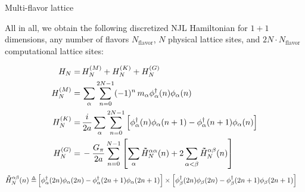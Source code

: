 \begin{frame}[allowframebreaks]{Multi-flavor lattice}
\break

  All in all, we obtain the following discretized NJL Hamiltonian for $1+1$ dimensions, any number of flavors $N_\text{flavor}$, $N$ physical lattice sites, and $2N\!\cdot\!N_\text{flavor}$ computational lattice sites:

  \begin{align*}
    H_{N} =&\, H_{N}^{(M)} + H_{N}^{(K)} + H_{N}^{(G)} \\
    H_{N}^{(M)} =&\,
      \sum_{\alpha} \sum_{n=0}^{2N-1}
      (-1)^{n} \, m_{\alpha} \phi_{\alpha}^{\dagger}(n)\phi_{\alpha}(n)  \\
    H_{N}^{(K)} =&\, \frac{i}{2a}
      \sum_{\alpha} \sum_{n=0}^{2N-1} \qty[
      \phi_{\alpha}^{\dagger}(n) \phi_{\alpha}(n+1) -
      \phi_{\alpha}^{\dagger}(n+1) \phi_{\alpha}(n)]  \\
    H_{N}^{(G)} =&\, - \frac{G_{\pi}}{2a} \sum_{n=0}^{N-1} \qty[
      \sum_{\alpha} \dbtilde{H}_{N}^{\alpha\alpha}(n) + 2
      \sum_{\alpha < \beta} \dbtilde{H}_{N}^{\alpha\beta}(n)]
  \end{align*}
  \begin{align*}
    \dbtilde{H}_{N}^{\alpha\beta}(n) \defeq&\,
      \qty[\phi_{\alpha}^{\dagger}(2n)\phi_{\alpha}(2n) -
      \phi_{\alpha}^{\dagger}(2n+1)\phi_{\alpha}(2n+1)] \times
      \qty[\phi_{\beta}^{\dagger}(2n)\phi_{\beta}(2n) -
      \phi_{\beta}^{\dagger}(2n+1)\phi_{\beta}(2n+1)]
  \end{align*}

\end{frame}
